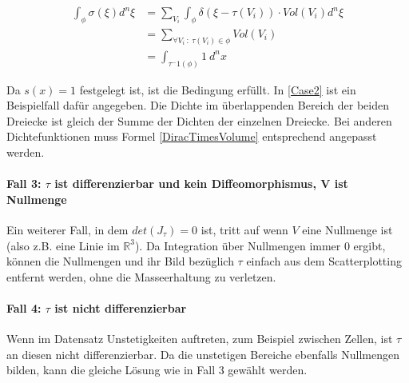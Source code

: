 \documentclass[a4paper,fontsize=12pt,toc=bib,halfparskip]{scrartcl}
\begin{document}
\begin{equation}
	\begin{split}
	\int_{\phi}\sigma(\xi)d^n\xi &= \sum_{V_i}\int_{\phi}\delta(\xi - \tau(V_i)) \cdot Vol(V_i)d^n\xi\\
								 &= \sum_{\forall V_i~:~\tau(V_i)\in \phi} Vol(V_i)\\
								 &= \int_{\tau^-1(\phi)}1~d^nx
	\end{split}
\end{equation}

Da $s(x) = 1$ festgelegt ist, ist die Bedingung erf\"ullt. In \ref{Case2} ist ein Beispielfall daf\"ur angegeben. Die Dichte im \"uberlappenden Bereich der beiden Dreiecke ist gleich der Summe der Dichten der einzelnen Dreiecke. Bei anderen Dichtefunktionen muss Formel \ref{DiracTimesVolume} entsprechend angepasst werden.

\paragraph{Fall 3: $\tau$ ist differenzierbar und kein Diffeomorphismus, V ist Nullmenge}
Ein weiterer Fall, in dem $det(J_\tau) = 0$ ist, tritt auf wenn $V$ eine Nullmenge ist (also z.B. eine Linie im $\mathbb{R}^3$). Da Integration \"uber Nullmengen immer 0 ergibt, k\"onnen die Nullmengen und ihr Bild bez\"uglich $\tau$ einfach aus dem Scatterplotting entfernt werden, ohne die Masseerhaltung zu verletzen.

\paragraph{Fall 4: $\tau$ ist nicht differenzierbar}
Wenn im Datensatz Unstetigkeiten auftreten, zum Beispiel zwischen Zellen, ist $\tau$ an diesen nicht differenzierbar. Da die unstetigen Bereiche ebenfalls Nullmengen bilden, kann die gleiche L\"osung wie in Fall 3 gew\"ahlt werden.
\end{document}
